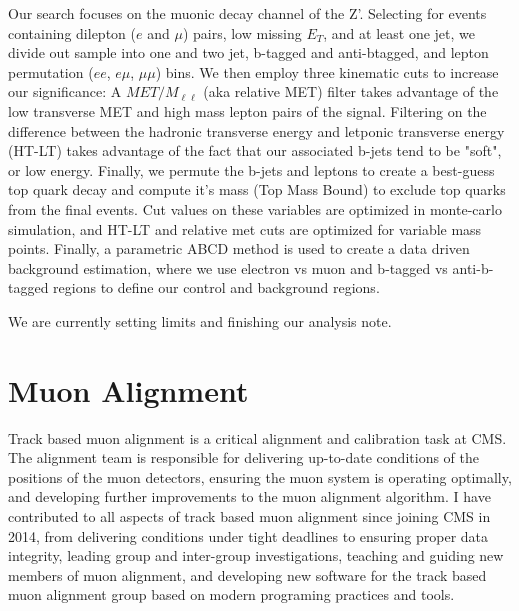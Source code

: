 \documentclass[11pt]{article}
\begin{document}
Our search focuses on the muonic decay channel of the Z'. Selecting for events containing dilepton ($e$ and $\mu$) pairs, low missing $E_T$, and at least one jet, we divide out sample into one and two jet, b-tagged and anti-btagged, and lepton permutation ($ee$, $e\mu$, $\mu\mu$) bins. We then employ three kinematic cuts to increase our significance: A $MET/M_{\ell\ell}$ (aka relative MET) filter takes advantage of the low transverse MET and high mass lepton pairs of the signal. Filtering on the difference between the hadronic transverse energy and letponic transverse energy (HT-LT) takes advantage of the fact that our associated b-jets tend to be "soft", or low energy. Finally, we permute the b-jets and leptons to create a best-guess top quark decay and compute it's mass (Top Mass Bound) to exclude top quarks from the final events. Cut values on these variables are optimized in monte-carlo simulation, and HT-LT and relative met cuts are optimized for variable mass points. Finally, a parametric ABCD method is used to create a data driven background estimation, where we use electron vs muon and b-tagged vs anti-b-tagged regions to define our control and background regions. 

We are currently setting limits and finishing our analysis note. 

\section{Muon Alignment}

 Track based muon alignment is a critical alignment and calibration task at CMS. The alignment team is responsible for delivering up-to-date conditions of the positions of the muon detectors, ensuring the muon system is operating optimally, and developing further improvements to the muon alignment algorithm. I have contributed to all aspects of track based muon alignment since joining CMS in 2014, from delivering conditions under tight deadlines to ensuring proper data integrity, leading group and inter-group investigations, teaching and guiding new members of muon alignment, and developing new software for the track based muon alignment group based on modern programing practices and tools.
 
 
\end{document}
